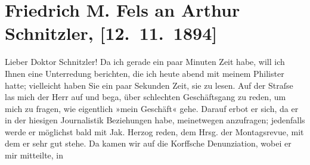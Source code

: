 

         
         \renewcommand{\erwaehntePersonen}{Personen:  ?? [Vermieter von F. M. Fels], Jakob Herzog, Heinrich von Korff}
         \renewcommand{\erwaehnteInstitutionen}{Institutionen: Montags-Revue}
         \renewcommand{\erwaehnteOrte}{Orte: Wien}
         \renewcommand{\erwaehnteWerke}{}
               \section[Friedrich M. Fels an Arthur Schnitzler, {[}12. 11. 1894{]}]{ Friedrich M. Fels an Arthur Schnitzler, {[}12. 11. 1894{]}}\nopagebreak{}\rehead{ }\begin{ledgroupsized}[t]{13cm}\normalsize\beginnumbering \toendnotes[C]{\smallbreak\pagebreak[2]} 
\toendnotes[C]{\smallbreak}\pstart{}{\pb}Lieber Doktor Schnitzler!\pend\pstart
           Da ich gerade ein paar Minuten Zeit habe, will ich Ihnen eine Unterredung
                    berichten, die ich heute abend mit meinem Philister hatte; vielleicht haben Sie ein paar
                    Sekunden Zeit, sie zu lesen.\pend
           \pstart
           Auf der Straſse las mich der Herr auf und bega{\geminationn},
                    über schlechten Geschäftsgang zu reden, um mich zu fragen, wie eigentlich »mein
                    Geschäft« gehe. Darauf erbot er sich, da er in der hiesigen Journalistik
                    Beziehungen habe, meinetwegen anzufragen; jedenfalls werde er möglichst bald mit
                        Jak. Herzog reden, dem Hrsg. der Montagsrevue, mit dem er sehr gut stehe.\pend
           \pstart
           Da{\geminationn} kamen wir auf die Korffsche Denunziation, wobei er mir mitteilte, in

\end{ledgroupsized}
